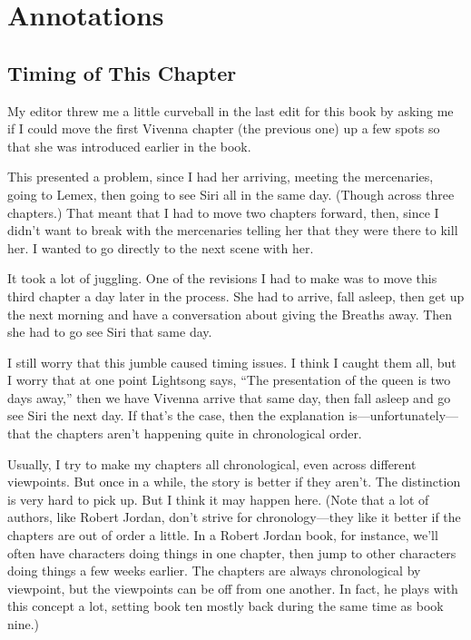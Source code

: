 \section*{Annotations}

\subsection*{Timing of This Chapter}

My editor threw me a little curveball in the last edit for this book by asking me if I could move the first Vivenna chapter (the previous one) up a few spots so that she was introduced earlier in the book.

This presented a problem, since I had her arriving, meeting the mercenaries, going to Lemex, then going to see Siri all in the same day. (Though across three chapters.) That meant that I had to move two chapters forward, then, since I didn’t want to break with the mercenaries telling her that they were there to kill her. I wanted to go directly to the next scene with her.

It took a lot of juggling. One of the revisions I had to make was to move this third chapter a day later in the process. She had to arrive, fall asleep, then get up the next morning and have a conversation about giving the Breaths away. Then she had to go see Siri that same day.

I still worry that this jumble caused timing issues. I think I caught them all, but I worry that at one point Lightsong says, “The presentation of the queen is two days away,” then we have Vivenna arrive that same day, then fall asleep and go see Siri the next day. If that’s the case, then the explanation is—unfortunately—that the chapters aren’t happening quite in chronological order.

Usually, I try to make my chapters all chronological, even across different viewpoints. But once in a while, the story is better if they aren’t. The distinction is very hard to pick up. But I think it may happen here. (Note that a lot of authors, like Robert Jordan, don’t strive for chronology—they like it better if the chapters are out of order a little. In a Robert Jordan book, for instance, we’ll often have characters doing things in one chapter, then jump to other characters doing things a few weeks earlier. The chapters are always chronological by viewpoint, but the viewpoints can be off from one another. In fact, he plays with this concept a lot, setting book ten mostly back during the same time as book nine.)

